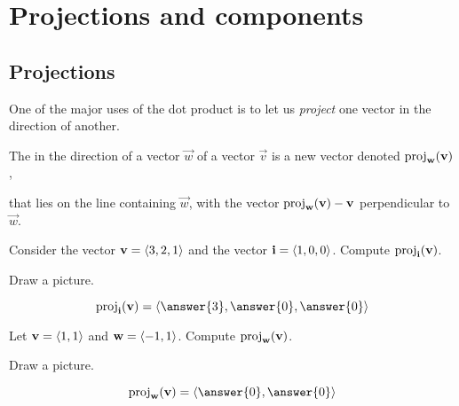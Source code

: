 \documentclass{ximera}
\begin{document}
\section{Projections and components}

\subsection{Projections}
One of the major uses of the dot product is to let us \textit{project}
one vector in the direction of another.

\begin{definition}
  The  in the direction of a vector $\vec{w}$ of a
  vector $\vec{v}$ is a new vector denoted $\operatorname{proj}_\mathbf{w}(\mathbf{v})$,
  \begin{image}
    \qquad
  \end{image}
  that lies on the line containing $\vec{w}$, with the vector
  $\operatorname{proj}_\mathbf{w}(\mathbf{v}) - \mathbf{v}$ perpendicular to $\vec{w}$.
\end{definition}

\begin{question}
  Consider the vector $\mathbf{v}=\left\langle 3,2,1\right\rangle$ and the vector $\mathbf{i} =
  \left\langle 1,0,0\right\rangle$.  Compute $\operatorname{proj}_{\mathbf{i}}(\mathbf{v})$.
  \begin{hint}
    Draw a picture.
  \end{hint}
  \begin{prompt}
    \[
    \proj_\veci(\vec{v}) = \vector{\answer{3},\answer{0},\answer{0}}
    \]
  \end{prompt}
  \begin{question}
    Let $\mathbf{v} = \left\langle 1,1\right\rangle$ and $\mathbf{w}=\left\langle -1,1\right\rangle$. Compute
    $\operatorname{proj}_\mathbf{w}(\mathbf{v})$.
    \begin{hint}
      Draw a picture.
    \end{hint}
      \begin{prompt}
        \[
        \proj_\vec{w}(\vec{v}) = \vector{\answer{0},\answer{0}}
        \]
      \end{prompt}
  \end{question}
\end{question}
\end{document}
